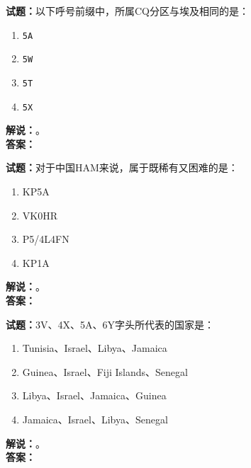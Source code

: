 \documentclass{ctexbook}
\begin{document}
\vspace{\baselineskip}

\noindent\textbf{试题：}以下呼号前缀中，所属CQ分区与埃及相同的是：
\begin{enumerate}[leftmargin=3em]
  \item \texttt{5A}
  \item \texttt{5W}
  \item \texttt{5T}
  \item \texttt{5X}
\end{enumerate}
\noindent\textbf{解说：}\textbf{}。\\\noindent\textbf{答案：}

\vspace{\baselineskip}

\noindent\textbf{试题：}对于中国HAM来说，属于既稀有又困难的是：
\begin{enumerate}[leftmargin=3em]
  \item KP5A
  \item VK0HR
  \item P5/4L4FN
  \item KP1A
\end{enumerate}
\noindent\textbf{解说：}\textbf{}。\\\noindent\textbf{答案：}

\vspace{\baselineskip}

\noindent\textbf{试题：}3V、4X、5A、6Y字头所代表的国家是：
\begin{enumerate}[leftmargin=3em]
  \item Tunisia、Israel、Libya、Jamaica %
  \item Guinea、Israel、Fiji Islands、Senegal
  \item Libya、Israel、Jamaica、Guinea
  \item Jamaica、Israel、Libya、Senegal
\end{enumerate}
\noindent\textbf{解说：}\textbf{}。\\\noindent\textbf{答案：}

\vspace{\baselineskip}
\end{document}
